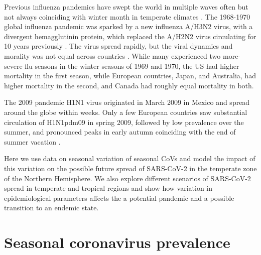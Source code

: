 \documentclass[rmp, reprint, superscriptaddress, floatfix,amsmath]{revtex4-1}
\begin{document}

Previous influenza pandemics have swept the world in multiple waves often but not always coinciding with winter month in temperate climates \citep{taubenberger_1918_2019,viboud_multinational_2005,viboud_global_2016,amato-gauci_surveillance_2011}. 
The 1968-1970 global influenza pandemic was sparked by a new influenza A/H3N2 virus, with a divergent hemagglutinin protein, which replaced the A/H2N2 virus circulating for 10 years previously \citep{viboud_multinational_2005}. The virus spread rapidly, but the viral dynamics and morality was not equal across countries \citep{viboud_multinational_2005}. While many experienced two more-severe flu seasons in the winter seasons of 1969 and 1970, the US had higher mortality in the first season, while European countries, Japan, and Australia, had higher mortality in the second, and Canada had roughly equal mortality in both.

The 2009 pandemic H1N1 virus originated in March 2009 in Mexico and spread around the globe within weeks.
Only a few European countries saw substantial circulation of H1N1pdm09 in spring 2009, followed by low prevalence over the summer, and pronounced peaks in early autumn coinciding with the end of summer vacation \citep{amato-gauci_surveillance_2011}.

Here we use data on seasonal variation of seasonal CoVs and model the impact of this variation on the possible future spread of SARS-CoV-2 in the temperate zone of the Northern Hemisphere. 
We also explore different scenarios of SARS-CoV-2 spread in temperate and tropical regions and show how variation in epidemiological parameters affects the a potential pandemic and a possible transition to an endemic state. 

\section{Seasonal coronavirus prevalence} 
\end{document}
